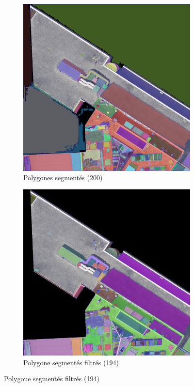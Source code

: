 \begin{figure}[H]
    \vspace{0.35cm} %
    
    \begin{subfigure}[b]{0.48\textwidth}
        \centering
        \includegraphics[width=\textwidth]{02-main/figures/ch3_essai_sam_03_200_masks.png}
        \caption{Polygones segmentés (200)}
        \label{fig:ch3_essai_sam_03_200_masks}
    \end{subfigure}
    \hfill
    \begin{subfigure}[b]{0.48\textwidth}
        \centering
        \includegraphics[width=\textwidth]{02-main/figures/ch3_essai_sam_04_194_filtered_masks.png}
        \caption{Polygone segmentés filtrés (194)}
        \label{fig:ch3_essai_sam_04_194_filtered_masks}
    \end{subfigure}


\end{figure}
